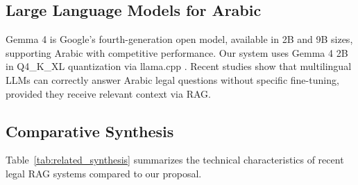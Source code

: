 \subsection{Large Language Models for Arabic}

Gemma 4 \cite{google2025gemma4} is Google's fourth-generation open model,
available in 2B and 9B sizes, supporting Arabic with competitive
performance. Our system uses Gemma 4 2B in Q4\_K\_XL quantization via
llama.cpp \cite{gerganov2023llamacpp}. Recent studies \cite{hendy2023llm}
show that multilingual LLMs can correctly answer Arabic legal questions
without specific fine-tuning, provided they receive relevant context via RAG.

\subsection{Comparative Synthesis}

Table~\ref{tab:related_synthesis} summarizes the technical characteristics
of recent legal RAG systems compared to our proposal.

\begin{table}[H]
\centering
\caption{Comparative synthesis of recent legal RAG systems}
\label{tab:related_synthesis}
\renewcommand{\arraystretch}{1.15}
\end{table}
